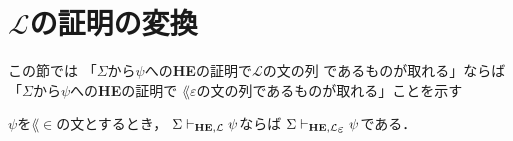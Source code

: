 \section{$\mathcal{L}$の証明の変換}
\label{sec:L_proof_to_L_epsilon_proof}
	この節では 「$\Sigma$から$\psi$への{\bf HE}の証明で$\mathcal{L}$の文の列
	であるものが取れる」ならば 「$\Sigma$から$\psi$への{\bf HE}の証明で
	$\lang{\varepsilon}$の文の列であるものが取れる」ことを示す
	
	\begin{screen}
		\begin{metathm}
			$\psi$を$\lang{\in}$の文とするとき，
			$\Sigma \vdash_{{\scriptsize \mbox{{\bf HE}},\mathcal{L}}} \psi$ならば
			$\Sigma \provable{\mbox{{\bf HE}},\lang{\varepsilon}} \psi$である．
		\end{metathm}
	\end{screen}
	
